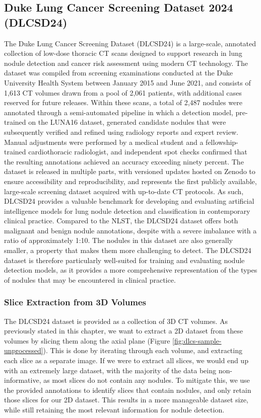 \subsection{Duke Lung Cancer Screening Dataset 2024 (DLCSD24)}
The Duke Lung Cancer Screening Dataset (DLCSD24) is a large-scale, annotated collection of low-dose thoracic CT scans designed to support research in lung nodule detection and cancer risk assessment using modern CT technology. The dataset was compiled from screening examinations conducted at the Duke University Health System between January 2015 and June 2021, and consists of 1,613 CT volumes drawn from a pool of 2,061 patients, with additional cases reserved for future releases. Within these scans, a total of 2,487 nodules were annotated through a semi-automated pipeline in which a detection model, pre-trained on the LUNA16 dataset, generated candidate nodules that were subsequently verified and refined using radiology reports and expert review. Manual adjustments were performed by a medical student and a fellowship-trained cardiothoracic radiologist, and independent spot checks confirmed that the resulting annotations achieved an accuracy exceeding ninety percent. The dataset is released in multiple parts, with versioned updates hosted on Zenodo to ensure accessibility and reproducibility, and represents the first publicly available, large-scale screening dataset acquired with up-to-date CT protocols. As such, DLCSD24 provides a valuable benchmark for developing and evaluating artificial intelligence models for lung nodule detection and classification in contemporary clinical practice.
Compared to the NLST, the DLCSD24 dataset offers both malignant and benign nodule annotations, despite with a severe imbalance with a ratio of approximately 1:10. The nodules in this dataset are also generally smaller, a property that makes them more challenging to detect. The DLCSD24 dataset is therefore particularly well-suited for training and evaluating nodule detection models, as it provides a more comprehensive representation of the types of nodules that may be encountered in clinical practice.

\subsubsection{Slice Extraction from 3D Volumes}
The DLCSD24 dataset is provided as a collection of 3D CT volumes. As previously stated in this chapter, we want to extract a 2D dataset from these volumes by slicing them along the axial plane (Figure \ref{fig:dlcs-sample-unprocessed}). This is done by iterating through each volume, and extracting each slice as a separate image. If we were to extract all slices, we would end up with an extremely large dataset, with the majority of the data being non-informative, as most slices do not contain any nodules. To mitigate this, we use the provided annotations to identify slices that contain nodules, and only retain those slices for our 2D dataset. This results in a more manageable dataset size, while still retaining the most relevant information for nodule detection. 

